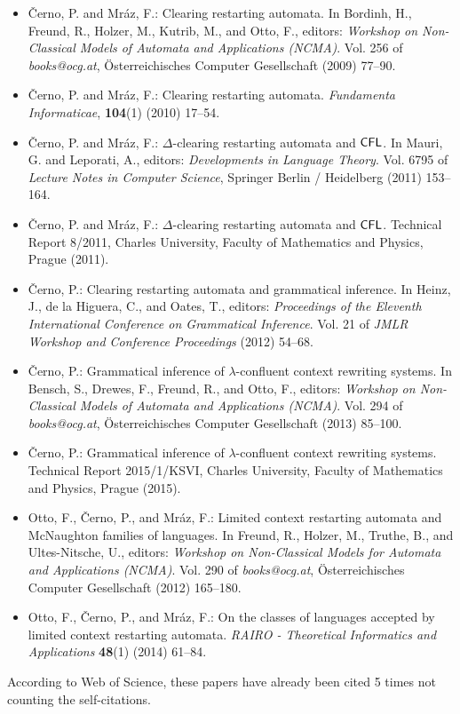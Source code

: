 \begin{itemize}
\item {\v C}erno, P. and Mr{\'a}z, F.: Clearing restarting automata. In Bordinh, H., Freund, R., Holzer, M., Kutrib, M., and Otto, F., editors: \emph{Workshop on Non-Classical Models of Automata and Applications (NCMA)}. Vol. 256 of \emph{books@ocg.at}, {\"O}sterreichisches Computer Gesellschaft (2009) 77--90.
\item {\v C}erno, P. and Mr{\'a}z, F.: Clearing restarting automata. \emph{Fundamenta Informaticae}, {\bf 104}(1) (2010) 17--54.
\item {\v C}erno, P. and Mr{\'a}z, F.: $\Delta$-clearing restarting automata and $\textup{\sf CFL}$. In Mauri, G. and Leporati, A., editors: \emph{Developments in Language Theory}. Vol. 6795 of \emph{Lecture Notes in Computer Science}, Springer Berlin / Heidelberg (2011) 153--164.
\item {\v C}erno, P. and Mr{\'a}z, F.: $\Delta$-clearing restarting automata and $\textup{\sf CFL}$. Technical Report 8/2011, Charles University, Faculty of Mathematics and Physics, Prague (2011).
\item {\v C}erno, P.: Clearing restarting automata and grammatical inference. In Heinz, J., de la Higuera, C., and Oates, T., editors: \emph{Proceedings of the Eleventh International Conference on Grammatical Inference}. Vol. 21 of \emph{JMLR Workshop and Conference Proceedings} (2012) 54--68.
\item {\v C}erno, P.: Grammatical inference of $\lambda$-confluent context rewriting systems. In Bensch, S., Drewes, F., Freund, R., and Otto, F., editors: \emph{Workshop on Non-Classical Models of Automata and Applications (NCMA)}. Vol. 294 of \emph{books@ocg.at}, {\"O}sterreichisches Computer Gesellschaft (2013) 85--100.
\item {\v C}erno, P.: Grammatical inference of $\lambda$-confluent context rewriting systems. Technical Report 2015/1/KSVI, Charles University, Faculty of Mathematics and Physics, Prague (2015).
\item Otto, F., {\v C}erno, P., and Mr{\'a}z, F.: Limited context restarting automata and McNaughton families of languages. In Freund, R., Holzer, M., Truthe, B., and Ultes-Nitsche, U., editors: \emph{Workshop on Non-Classical Models for Automata and Applications (NCMA)}. Vol. 290 of \emph{books@ocg.at}, {\"O}sterreichisches Computer Gesellschaft (2012) 165--180.
\item Otto, F., {\v C}erno, P., and Mr{\'a}z, F.: On the classes of languages accepted by limited context restarting automata. \emph{RAIRO - Theoretical Informatics and Applications} {\bf 48}(1) (2014) 61--84.
\end{itemize}

According to Web of Science, these papers have already been cited 5 times not counting the self-citations.

